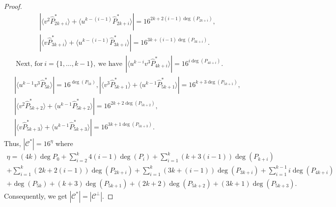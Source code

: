 \documentclass{amsart}
\theoremstyle{definition}
\theoremstyle{remark}
\numberwithin{equation}{section}
\begin{document}
\begin{proof}
\begin{gather*}
     |\langle v^2 \hat{P}_{2k+i}^* \rangle + \langle u^{k-(i-1)} \hat{P}_{2k+i}^* \rangle| = 16^{2k+2(i-1)\deg(P_{2k+i})}, \\  |\langle v \hat{P}_{3k+i}^* \rangle + \langle u^{k-(i-1)} \hat{P}_{3k+i}^* \rangle| = 16^{3k+(i-1)\deg(P_{3k+i})}.
     \end{gather*}
     \begin{gather*}
     ~  \text{Next, for} ~i = \{1,\dots,k-1\}, ~\text{we have}~~ |\langle u^{k-i}v^3 \hat{P}_{4k+i}^* \rangle| = 16^{i\deg(P_{4k+i})}.\\    |\langle u^{k-1}v^3 \hat{P}_{5k}^* \rangle | = 16^{\deg(P_{5k})},   |\langle v^3 \hat{P}_{5k+1}^* \rangle + \langle u^{k-1} \hat{P}_{5k+1}^* \rangle| = 16^{k+3\deg(P_{5k+1})},   \\  |\langle v^2 \hat{P}_{5k+2}^* \rangle + \langle u^{k-1} \hat{P}_{5k+2}^* \rangle| =16^{2k+2\deg(P_{5k+2})},\\|\langle v \hat{P}_{5k+3}^* \rangle + \langle u^{k-1} \hat{P}_{5k+3}^* \rangle| = 16^{3k+1\deg(P_{5k+3})}.
    \end{gather*}
    Thus, $|\mathcal{C}^*|=16^{\eta}$ where
\begin{gather*}
    \eta = (4k)\deg {P}_0 +\sum_{i=2}^{k} 4(i-1)\deg (P_i) +\sum_{i=1}^{k} (k+3(i-1)) \deg (P_{k+i}) \\+\sum_{i=1}^{k} (2k+2(i-1)) \deg (P_{2k+i})  +\sum_{i=1}^{k} (3k+(i-1)) \deg (P_{3k+i})+\sum_{i=1}^{k-1} i \deg (P_{4k+i}) \\+ \deg (P_{5k}) + (k+3)\deg (P_{5k+1})  + (2k+2) \deg (P_{5k+2}) + (3k+1)\deg (P_{5k+3}).
\end{gather*}
Consequently, we get $ |\mathcal{C}^*|=|\mathcal{C}^\perp| $.
\end{proof}
\end{document}
